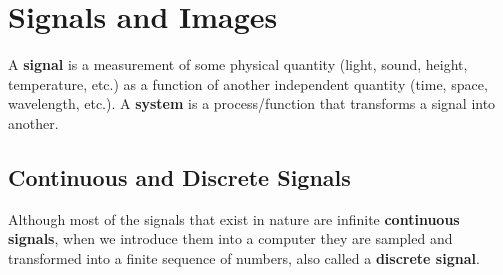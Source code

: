 



\section{Signals and Images}

A {\bf signal} is a measurement of some physical quantity (light, sound, height, temperature, etc.) as a function of another independent quantity (time, space, wavelength, etc.). A {\bf system} is a process/function that transforms a signal into another.





\subsection{Continuous and Discrete Signals}


Although most of the signals that exist in nature are infinite {\bf continuous signals},
when we introduce them into a computer they are sampled and transformed into a finite sequence of numbers, also called a {\bf discrete signal}.

